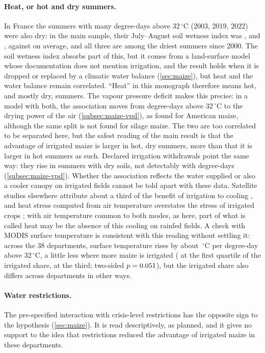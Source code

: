 \paragraph{Heat, or hot and dry summers.} In France the summers with many degree-days above 32\,$^{\circ}$C (2003, 2019, 2022) were also dry: in the main sample, their July--August soil wetness index was \SwiTwoThousandThree, \SwiTwentyNineteen{} and \SwiTwentyTwentyTwo, against \SwiMean{} on average, and all three are among the \SwiRankMax{} driest summers since 2000. The soil wetness index absorbs part of this, but it comes from a land-surface model whose documentation does not mention irrigation, and the result holds when it is dropped or replaced by a climatic water balance (\cref{sec:maize}), but heat and the water balance remain correlated. ``Heat'' in this monograph therefore means hot, and mostly dry, summers. The vapour pressure deficit makes this precise: in a model with both, the association moves from degree-days above 32\,$^{\circ}$C to the drying power of the air (\cref{subsec:maize-vpd}), as \textcite{lobell2013} found for American maize, although the same split is not found for silage maize. The two are too correlated to be separated here, but the safest reading of the main result is that the advantage of irrigated maize is larger in hot, dry summers, more than that it is larger in hot summers as such. Declared irrigation withdrawals point the same way: they rise in summers with dry soils, not detectably with degree-days (\cref{subsec:maize-vpd}). Whether the association reflects the water supplied or also a cooler canopy on irrigated fields cannot be told apart with these data. Satellite studies elsewhere attribute about a third of the benefit of irrigation to cooling \parencite{zhu2022}, and heat stress computed from air temperature overstates the stress of irrigated crops \parencite{siebert2017}; with air temperature common to both modes, as here, part of what is called heat may be the absence of this cooling on rainfed fields. A check with MODIS surface temperature is consistent with this reading without settling it: across the 38 departments, surface temperature rises by about \LstSlope{}\,$^{\circ}$C per degree-day above 32\,$^{\circ}$C, a little less where more maize is irrigated (\LstSlopeQone{} at the first quartile of the irrigated share, \LstSlopeQthree{} at the third; two-sided $p = 0.051$), but the irrigated share also differs across departments in other ways.

\paragraph{Water restrictions.} The pre-specified interaction with crisis-level restrictions has the opposite sign to the hypothesis (\cref{sec:maize}). It is read descriptively, as planned, and it gives no support to the idea that restrictions reduced the advantage of irrigated maize in these departments.

